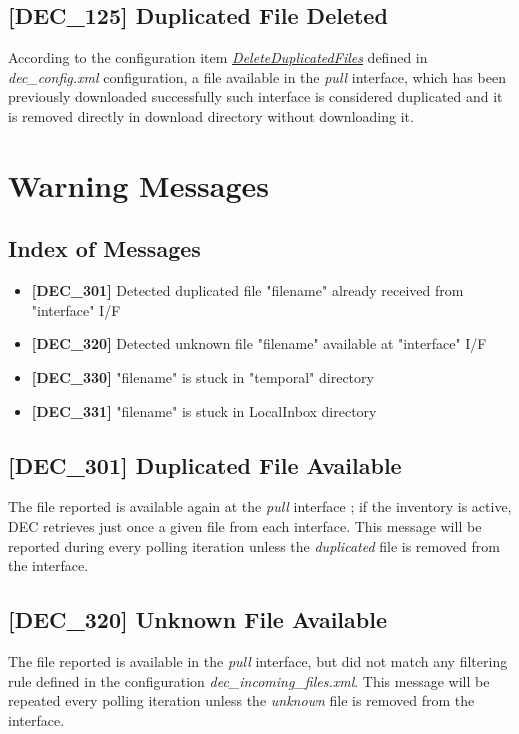 \documentclass[dec_sum_main.tex]{subfiles}
\begin{document}
\subsection{[DEC\_125] Duplicated File Deleted}
According to the configuration item \hyperref[DeleteDuplicatedFiles]{\textit{DeleteDuplicatedFiles}} defined in \textit{dec\_config.xml} configuration, a file available in the \textit{pull} interface, which has been previously downloaded successfully such interface is considered duplicated and it is removed directly in download directory without downloading it.


\section{Warning Messages}

\subsection{Index of Messages}

\begin{itemize}
	\item \textbf{[DEC\_301]} Detected duplicated file "filename" already received from "interface" I/F
	\item \textbf{[DEC\_320]} Detected unknown file "filename" available at "interface" I/F
	\item \textbf{[DEC\_330]} "filename" is stuck in "temporal" directory
	\item \textbf{[DEC\_331]} "filename" is stuck in LocalInbox directory		
\end{itemize}

\subsection{[DEC\_301] Duplicated File Available}
The file reported is available again at the \textit{pull} interface ; if the inventory is active, DEC retrieves just once a given file from each interface. This message will be reported during every polling iteration unless the \textit{duplicated} file is removed from the interface.

\subsection{[DEC\_320] Unknown File Available}
The file reported is available in the \textit{pull} interface, but did not match any filtering rule defined in the configuration \textit{dec\_incoming\_files.xml}. This message will be repeated every polling iteration unless the \textit{unknown} file is removed from the interface.
\end{document}

